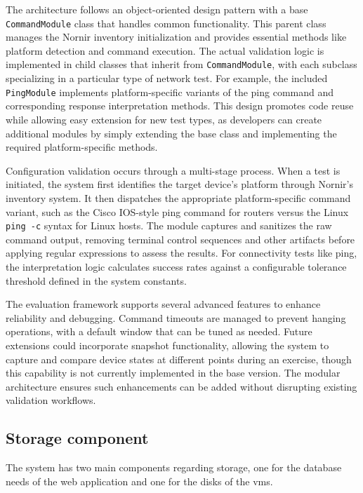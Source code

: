         The architecture follows an object-oriented design pattern with a base \texttt{CommandModule} class that handles common functionality. 
        This parent class manages the Nornir inventory initialization and provides essential methods like platform detection and command execution. 
        The actual validation logic is implemented in child classes that inherit from \texttt{CommandModule}, with each subclass specializing in 
        a particular type of network test. For example, the included \texttt{PingModule} implements platform-specific variants of the ping command 
        and corresponding response interpretation methods. This design promotes code reuse while allowing easy extension for new test types, as 
        developers can create additional modules by simply extending the base class and implementing the required platform-specific methods.
        
        Configuration validation occurs through a multi-stage process. When a test is initiated, the system first identifies the target device's 
        platform through Nornir's inventory system. It then dispatches the appropriate platform-specific command variant, such as the Cisco IOS-style 
        ping command for routers versus the Linux \texttt{ping -c} syntax for Linux hosts. The module captures and sanitizes the raw command output, 
        removing terminal control sequences and other artifacts before applying regular expressions to assess the results. For connectivity tests like 
        ping, the interpretation logic calculates success rates against a configurable tolerance threshold defined in the system constants.
        
        The evaluation framework supports several advanced features to enhance reliability and debugging. Command timeouts are managed to prevent 
        hanging operations, with a default window that can be tuned as needed. Future extensions could incorporate snapshot functionality, allowing 
        the system to capture and compare device states at different points during an exercise, though this capability is not currently implemented 
        in the base version. The modular architecture ensures such enhancements can be added without disrupting existing validation workflows.

    \subsection{Storage component}
        
        The system has two main components regarding storage, one for the database needs of the web application and one for the disks of the \ac{vm}s.

